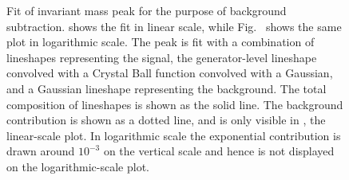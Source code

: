  \begin{figure}[htb]
  \begin{center}
  \end{center}
  \caption[\fixspacing Functional fit of \Zee invariant mass peak 
    for background subtraction]{
    \fixspacing Fit of \Zee invariant mass peak for the purpose 
    of background subtraction.  
    shows the fit in linear 
    scale, while 
    Fig.~ 
    shows the 
    same plot in logarithmic scale.  
    The peak is fit with a combination of 
    lineshapes representing the signal, 
    the generator-level lineshape convolved with 
    a Crystal Ball function convolved with a Gaussian, 
    and a Gaussian lineshape representing the background.  
    The total composition of lineshapes is shown as the 
    solid line.  
    The background contribution is shown as a dotted line, 
    and is only visible in 
    , 
    the linear-scale plot.  
    In logarithmic scale the exponential contribution is
    drawn around $10^{-3}$ on the vertical scale 
    and hence is not displayed 
    on the logarithmic-scale plot.  
  }
  \label{fig:ZFit}
 \end{figure}

